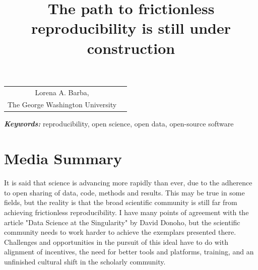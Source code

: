 \documentclass[]{hdsr}
\begin{document}




\begin{center}

  \title{The path to frictionless reproducibility is still under construction}
  \maketitle

  \thispagestyle{empty}
  
  \vspace*{.2in}

  \begin{tabular}{cc}
    Lorena A. Barba\upstairs{\affilone,*},
   \\[0.25ex]
   {\small \upstairs{\affilone} The George Washington University} \\
  \end{tabular}
  
  \vspace*{0.4in}

\end{center}

\vspace*{0.15in}
\hspace{10pt}
  \small	
  \textbf{\textit{Keywords: }} {reproducibility, open science, open data, open-source software}
  
\copyrightnotice

\section*{Media Summary}

It is said that science is advancing more rapidly than ever, due to the adherence to open sharing of data, code, methods and results. This may be true in some fields, but the reality is that the broad scientific community is still far from achieving frictionless reproducibility. I have many points of agreement with the article "Data Science at the Singularity" by David Donoho, but the scientific community needs to work harder to achieve the exemplars presented there. Challenges and opportunities in the pursuit of this ideal have to do with alignment of incentives, the need for better tools and platforms, training, and an unfinished cultural shift in the scholarly community.
\end{document}
